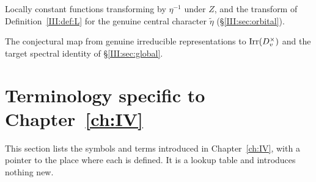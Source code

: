 \begin{description}[style=nextline,leftmargin=2.7cm,labelwidth=2.5cm,font=\normalfont\bfseries]
\item[$\mathcal C_{\eta^{-1}}(H)$, $L_D^{(\widetilde\eta)}$]
Locally constant functions transforming by $\eta^{-1}$ under $Z$, and the transform of Definition~\ref{III:def:L} for the genuine central character $\widetilde\eta$ (\S\ref{III:sec:orbital}).
\item[$\Psi_D$, (\ref{III:eq:global-conj})]
The conjectural map from genuine irreducible representations to $\Irr(D_v^\times)$ and the target spectral identity of \S\ref{III:sec:global}.
\end{description}
\endgroup
\begingroup
\providecommand{\F}{}\renewcommand{\F}{F}
\providecommand{\K}{}\renewcommand{\K}{K}
\providecommand{\A}{}\renewcommand{\A}{\mathbb A}
\providecommand{\C}{}\renewcommand{\C}{\mathbb C}
\providecommand{\Z}{}\renewcommand{\Z}{\mathbb Z}
\providecommand{\GL}{}\renewcommand{\GL}{\operatorname{GL}}
\providecommand{\Irr}{}\renewcommand{\Irr}{\operatorname{Irr}}
\providecommand{\Nrd}{}\renewcommand{\Nrd}{\operatorname{Nrd}}
\providecommand{\Nm}{}\renewcommand{\Nm}{\operatorname{N}}
\providecommand{\vol}{}\renewcommand{\vol}{\operatorname{vol}}
\providecommand{\Gal}{}\renewcommand{\Gal}{\operatorname{Gal}}
\providecommand{\Aut}{}\renewcommand{\Aut}{\operatorname{Aut}}
\providecommand{\reg}{}\renewcommand{\reg}{\mathrm{reg}}
\providecommand{\tH}{}\renewcommand{\tH}{\widetilde H}
\providecommand{\tZ}{}\renewcommand{\tZ}{\widetilde Z}
\providecommand{\tT}{}\renewcommand{\tT}{\widetilde T}
\providecommand{\Gb}{}\renewcommand{\Gb}{\overline G}
\providecommand{\GDb}{}\renewcommand{\GDb}{\overline{G_D}}
\providecommand{\Ptag}{}\renewcommand{\Ptag}{\textnormal{\textbf{(P)}}}
\providecommand{\Etag}{}\renewcommand{\Etag}{\textnormal{\textbf{(E)}}}
\providecommand{\Ctag}{}\renewcommand{\Ctag}{\textnormal{\textbf{(C)}}}
\providecommand{\Otag}{}\renewcommand{\Otag}{\textnormal{\textbf{(O)}}}
\section{Terminology specific to \texorpdfstring{Chapter~\ref{ch:IV}}{Chapter 7}}\label{IV:sec:glossary}
This section lists the symbols and terms introduced in Chapter~\ref{ch:IV}, with a pointer to the place where each is defined. It is a lookup table and introduces nothing new.

